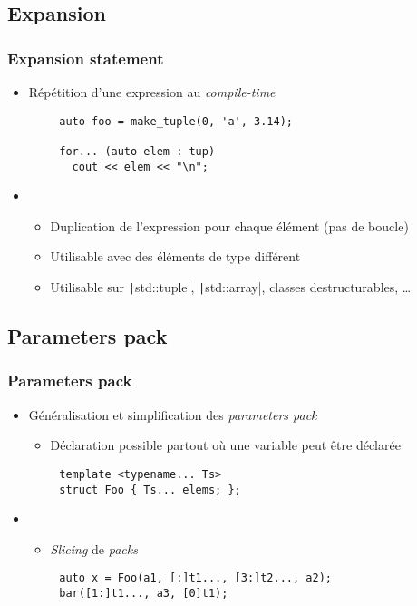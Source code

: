 \documentclass[C++.tex]{subfiles}
\begin{document}
\subsection*{Expansion}
\begin{frame}[fragile]
	\frametitle{Expansion statement}
	\begin{itemize}
		\item Répétition d'une expression au \textit{compile-time}
	\end{itemize}

	\begin{verbatim}
		auto foo = make_tuple(0, 'a', 3.14);

		for... (auto elem : tup)
		  cout << elem << "\n";
	\end{verbatim}

	\begin{itemize}
		\item []
		\begin{itemize}
			\item Duplication de l'expression pour chaque élément (pas de boucle)
			\item Utilisable avec des éléments de type différent
			\item Utilisable sur \texttt|std::tuple|, \texttt|std::array|, classes destructurables, \ldots{}
		\end{itemize}
	\end{itemize}
\end{frame}

\subsection*{Parameters pack}
\begin{frame}[fragile]
	\frametitle{Parameters pack}
	\begin{itemize}
		\item Généralisation et simplification des \textit{parameters pack}
		\begin{itemize}
			\item Déclaration possible partout où une variable peut être déclarée
		\end{itemize}
	\end{itemize}

	\begin{verbatim}
		template <typename... Ts>
		struct Foo { Ts... elems; };
	\end{verbatim}

	\begin{itemize}
		\item []
		\begin{itemize}
			\item \textit{Slicing} de \textit{packs}
		\end{itemize}
	\end{itemize}

	\begin{verbatim}
		auto x = Foo(a1, [:]t1..., [3:]t2..., a2);
		bar([1:]t1..., a3, [0]t1);
	\end{verbatim}

\end{frame}
\end{document}
